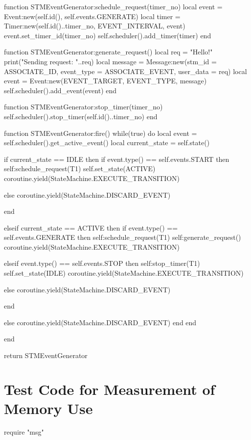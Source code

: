 \begin{appendices}
\begin{listing}[htp]
\begin{luacode}
function STMEventGenerator:schedule_request(timer_no)
	local event = Event:new(self.id(), self.events.GENERATE)
	local timer = Timer:new(self.id()..timer_no, EVENT_INTERVAL, event)
	event.set_timer_id(timer_no)
	self.scheduler().add_timer(timer)
end

function STMEventGenerator:generate_request()
	local req = "Hello!"
	print("Sending request: "..req)
	local message = Message:new({stm_id = ASSOCIATE_ID, event_type = ASSOCIATE_EVENT, user_data = req})
	local event = Event:new(EVENT_TARGET, EVENT_TYPE, message)
	self.scheduler().add_event(event)
end

function STMEventGenerator:stop_timer(timer_no)
	self.scheduler().stop_timer(self.id()..timer_no)
end

function STMEventGenerator:fire()
	while(true) do
		local event = self.scheduler().get_active_event()
		local current_state = self.state()

		if current_state == IDLE then
			if event.type() == self.events.START then
				self:schedule_request(T1)
				self.set_state(ACTIVE)
				coroutine.yield(StateMachine.EXECUTE_TRANSITION)
			
			else
				coroutine.yield(StateMachine.DISCARD_EVENT)
				
			end

		elseif current_state == ACTIVE then
			if event.type() == self.events.GENERATE then
				self:schedule_request(T1)
				self:generate_request()
				coroutine.yield(StateMachine.EXECUTE_TRANSITION)
			
			elseif event.type() == self.events.STOP then
				self:stop_timer(T1)
				self.set_state(IDLE)
				coroutine.yield(StateMachine.EXECUTE_TRANSITION)
			
			else
				coroutine.yield(StateMachine.DISCARD_EVENT)

			end

		else
			coroutine.yield(StateMachine.DISCARD_EVENT)
		end
	end

end

return STMEventGenerator
\end{luacode}
\end{listing}

\FloatBarrier
\section{Test Code for Measurement of Memory Use}

\begin{listing}[htp]
\begin{luacode}
require "msg"


\end{luacode}
\end{listing}
\end{appendices}
